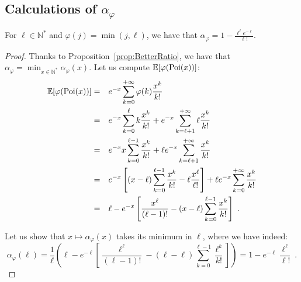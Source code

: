 \subsection{Calculations of $\alpha_{\varphi}$}
\begin{proposition}
  For $\ell \in \mathbb{N}^*$ and $\varphi(j) = \min(j,\ell)$, we have that $\alpha_{\varphi}=1-\frac{\ell^{\ell}e^{-\ell}}{\ell!}$.
  \label{prop:lCover}
\end{proposition}
\begin{proof}
  Thanks to Proposition~\ref{prop:BetterRatio}, we have that $\alpha_{\varphi} = \min_{x \in \mathbb{N}^*} \alpha_{\varphi}(x)$. Let us compute $\mathbb{E}[\varphi(\operatorname{\text{Poi}}(x))]$:
  \begin{equation}
    \begin{aligned}
      \mathbb{E}[\varphi(\operatorname{\text{Poi}}(x))] &=&& e^{-x}\sum_{k=0}^{+\infty}\varphi(k)\frac{x^k}{k!}\\
      &=&& e^{-x}\sum_{k=0}^{\ell}k\frac{x^k}{k!} + e^{-x}\sum_{k=\ell+1}^{+\infty}\ell\frac{x^k}{k!}\\
      &=&& e^{-x}x \sum_{k=0}^{\ell-1}\frac{x^k}{k!} + \ell e^{-x}\sum_{k=\ell+1}^{+\infty}\frac{x^k}{k!}\\
      &=&& e^{-x}\left[(x-\ell)\sum_{k=0}^{\ell-1}\frac{x^k}{k!} - \ell\frac{x^{\ell}}{\ell!}\right] + \ell e^{-x}\sum_{k=0}^{+\infty}\frac{x^k}{k!}\\
      &=&& \ell - e^{-x}\left[\frac{x^{\ell}}{(\ell-1)!} - (x-\ell)\sum_{k=0}^{\ell-1}\frac{x^k}{k!}\right] \ .
    \end{aligned}
  \end{equation}

  Let us show that $x \mapsto \alpha_{\varphi}(x)$ takes its minimum in $\ell$, where we have indeed:
  \[ \alpha_{\varphi}(\ell) = \frac{1}{\ell}\left( \ell - e^{-\ell}\left[\frac{\ell^{\ell}}{(\ell-1)!} - (\ell-\ell)\sum_{k=0}^{\ell-1}\frac{\ell^k}{k!}\right]\right) = 1 - e^{-\ell}\frac{\ell^{\ell}}{\ell!} \ . \]


\end{proof}
